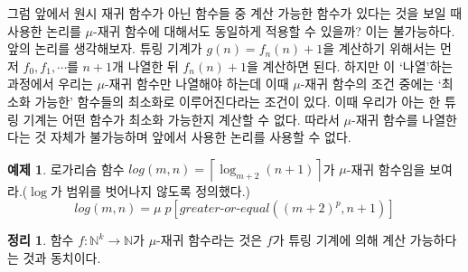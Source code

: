\documentclass[b5paper, 10pt]{book}
\theoremstyle{definition}
\newtheorem{thm}[defn]{정리}
\newtheorem{ex}[defn]{예제}
\begin{document}
그럼 앞에서 원시 재귀 함수가 아닌 함수들 중 계산 가능한 함수가 있다는 것을 보일 때 사용한 논리를 $\mu$-재귀
함수에 대해서도 동일하게 적용할 수 있을까? 이는 불가능하다. 앞의 논리를 생각해보자. 튜링 기계가 
$g(n) = f_n(n) + 1$을 계산하기 위해서는 먼저 $f_0, f_1, \cdots$를 $n+1$개 나열한 뒤 $f_n(n) + 1$을 
계산하면 된다. 하지만 이 `나열'하는 과정에서 우리는 $\mu$-재귀 함수만 나열해야 하는데 이때 $\mu$-재귀 함수의
조건 중에는 `최소화 가능한' 함수들의 최소화로 이루어진다라는 조건이 있다. 이때 우리가 아는 한
튜링 기계는 어떤 함수가 최소화 가능한지 계산할 수 없다. 
따라서 $\mu$-재귀 함수를 나열한다는 것 자체가 불가능하며 앞에서 사용한 논리를 사용할 수 없다. 
\begin{ex}
    로가리슴 함수 $log(m,n) = \left\lceil \log_{m+2}(n+1)\right\rceil$가 $\mu$-재귀 함수임을
    보여라.($\log$가 범위를 벗어나지 않도록 정의했다.)
    $$log(m,n) = \mu \; p[greater\text{-}or\text{-}equal((m+2)^p, n+1)]$$
\end{ex}
\begin{thm}
    함수 $f: \mathbb{N}^k \rightarrow \mathbb{N}$가 $\mu$-재귀 함수라는 것은 $f$가 튜링 기계에 의해 
    계산 가능하다는 것과 동치이다.  
\end{thm}
\end{document}

